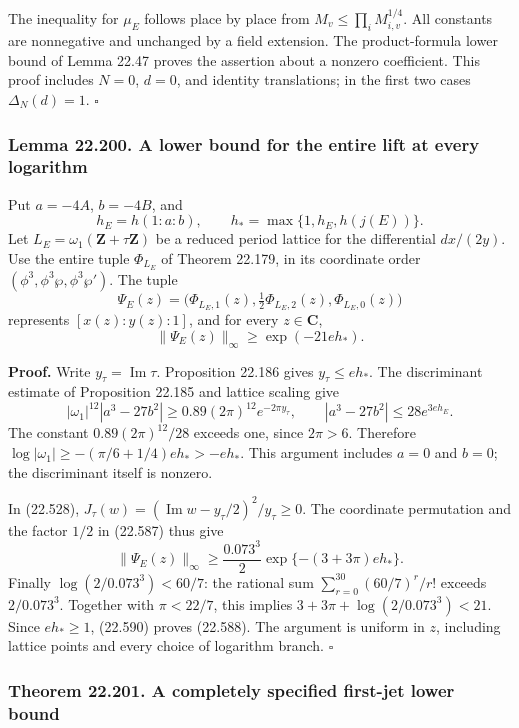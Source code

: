 \documentclass[
  11pt,
  a4paper,
]{article}
\begin{document}
The inequality for \(\mu_E\) follows place by place from
\(M_v\le\prod_iM_{i,v}^{1/4}\). All constants are nonnegative and
unchanged by a field extension. The product-formula lower bound of Lemma
22.47 proves the assertion about a nonzero coefficient. This proof
includes \(N=0\), \(d=0\), and identity translations; in the first two
cases \(\Delta_N(d)=1\). \(\square\)

\subsubsection{Lemma 22.200. A lower bound for the entire lift at every
logarithm}\label{lemma-22.200.-a-lower-bound-for-the-entire-lift-at-every-logarithm}

Put \(a=-4A\), \(b=-4B\), and \[
 h_E=h(1:a:b),\qquad h_* =\max\{1,h_E,h(j(E))\}.
 \tag{22.586}
\] Let \(L_E=\omega_1(\mathbf Z+\tau\mathbf Z)\) be a reduced period
lattice for the differential \(dx/(2y)\). Use the entire tuple
\(\Phi_{L_E}\) of Theorem 22.179, in its coordinate order
\((\phi^3,\phi^3\wp,\phi^3\wp')\). The tuple \[
 \Psi_E(z)=\bigl(\Phi_{L_E,1}(z),
                       \tfrac12\Phi_{L_E,2}(z),
                       \Phi_{L_E,0}(z)\bigr)
 \tag{22.587}
\] represents \([x(z):y(z):1]\), and for every \(z\in\mathbf C\), \[
 \|\Psi_E(z)\|_\infty\ge \exp(-21eh_*).
 \tag{22.588}
\]

\textbf{Proof.} Write \(y_\tau=\operatorname{Im}\tau\). Proposition
22.186 gives \(y_\tau\le eh_*\). The discriminant estimate of
Proposition 22.185 and lattice scaling give \[
 |\omega_1|^{12}|a^3-27b^2|
 \ge0.89(2\pi)^{12}e^{-2\pi y_\tau},\qquad
 |a^3-27b^2|\le28e^{3eh_E}.
 \tag{22.589}
\] The constant \(0.89(2\pi)^{12}/28\) exceeds one, since \(2\pi>6\).
Therefore \(\log|\omega_1|\ge-(\pi/6+1/4)eh_*>-eh_*\). This argument
includes \(a=0\) and \(b=0\); the discriminant itself is nonzero.

In (22.528), \(J_\tau(w)=(\operatorname{Im}w-y_\tau/2)^2/y_\tau\ge0\).
The coordinate permutation and the factor \(1/2\) in (22.587) thus give
\[
 \|\Psi_E(z)\|_\infty
 \ge\frac{0.073^3}{2}
       \exp\{-(3+3\pi)eh_*\}.
 \tag{22.590}
\] Finally \(\log(2/0.073^3)<60/7\): the rational sum
\(\sum_{r=0}^{30}(60/7)^r/r!\) exceeds \(2/0.073^3\). Together with
\(\pi<22/7\), this implies \(3+3\pi+\log(2/0.073^3)<21\). Since
\(eh_*\ge1\), (22.590) proves (22.588). The argument is uniform in
\(z\), including lattice points and every choice of logarithm branch.
\(\square\)

\subsubsection{Theorem 22.201. A completely specified first-jet lower
bound}\label{theorem-22.201.-a-completely-specified-first-jet-lower-bound}
\end{document}

